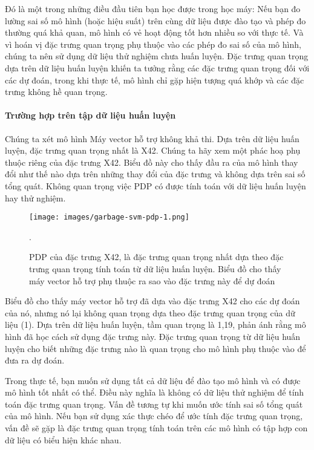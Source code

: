 Đó là một trong những điều đầu tiên bạn học được trong học máy: Nếu bạn đo lường sai số mô hình (hoặc hiệu suất) trên cùng dữ liệu được đào tạo và phép đo thường quá khả quan, mô hình có vẻ hoạt động tốt hơn nhiều so với thực tế. Và vì hoán vị đặc trưng quan trọng phụ thuộc vào các phép đo sai số của mô hình, chúng ta nên sử dụng dữ liệu thử nghiệm chưa huấn luyện. Đặc trưng quan trọng dựa trên dữ liệu huấn luyện khiến ta tưởng rằng các đặc trưng quan trọng đối với các dự đoán, trong khi thực tế, mô hình chỉ gặp hiện tượng quá khớp và các đặc trưng không hề quan trọng.

\paragraph{Trường hợp trên tập dữ liệu huấn luyện}
Chúng ta xét mô hình Máy vector hỗ trợ không khả thi. Dựa trên dữ liệu huấn luyện, đặc trưng quan trọng nhất là X42. Chúng ta hãy xem một phác hoạ phụ thuộc riêng của đặc trưng X42. Biểu đồ này cho thấy đầu ra của mô hình thay đổi như thế nào dựa trên những thay đổi của đặc trưng và không dựa trên sai số tổng quát. Không quan trọng việc PDP có được tính toán với dữ liệu huấn luyện hay thử nghiệm.


\begin{figure*}[h!]
	\centering
	\texttt{[image: images/garbage-svm-pdp-1.png]}
	\label{fig:5_28}
	\caption{PDP của đặc trưng X42, là đặc trưng quan trọng nhất dựa theo đặc trưng quan trọng tính toán từ dữ liệu huấn luyện. Biểu đồ cho thấy máy vector hỗ trợ phụ thuộc ra sao vào đặc trưng này để dự đoán}.
	
\end{figure*}

Biểu đồ cho thấy máy vector hỗ trợ đã dựa vào đặc trưng X42 cho các dự đoán của nó, nhưng nó lại không quan trọng dựa theo đặc trưng quan trọng của dữ liệu (1). Dựa trên dữ liệu huấn luyện, tầm quan trọng là 1,19, phản ánh rằng mô hình đã học cách sử dụng đặc trưng này. Đặc trưng quan trọng từ dữ liệu huấn luyện cho biết những đặc trưng nào là quan trọng cho mô hình phụ thuộc vào để đưa ra dự đoán.

Trong thực tế, bạn muốn sử dụng tất cả dữ liệu để đào tạo mô hình và có được mô hình tốt nhất có thể. Điều này nghĩa là không có dữ liệu thử nghiệm để tính toán đặc trưng quan trọng. Vấn đề tương tự khi muốn ước tính sai số tổng quát của mô hình. Nếu bạn sử dụng xác thực chéo để ước tính đặc trưng quan trọng, vấn đề sẽ gặp là đặc trưng quan trọng tính toán trên các mô hình có tập hợp con dữ liệu có biểu hiện khác nhau.

